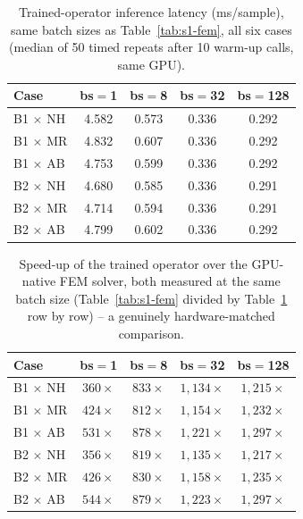 \documentclass[11pt]{article}
\begin{document}
\begin{table}[h]
\centering
\caption{Trained-operator inference latency (ms/sample), same batch
  sizes as Table~\ref{tab:s1-fem}, all six cases (median of 50 timed
  repeats after 10 warm-up calls, same GPU).}
\label{tab:s1-op}
\small
\begin{tabular}{lcccc}
\toprule
Case & bs$=$1 & bs$=$8 & bs$=$32 & bs$=$128 \\
\midrule
B1 $\times$ NH & 4.582 & 0.573 & 0.336 & 0.292 \\
B1 $\times$ MR & 4.832 & 0.607 & 0.336 & 0.292 \\
B1 $\times$ AB & 4.753 & 0.599 & 0.336 & 0.292 \\
B2 $\times$ NH & 4.680 & 0.585 & 0.336 & 0.291 \\
B2 $\times$ MR & 4.714 & 0.594 & 0.336 & 0.291 \\
B2 $\times$ AB & 4.799 & 0.602 & 0.336 & 0.292 \\
\bottomrule
\end{tabular}
\end{table}

\begin{table}[h]
\centering
\caption{Speed-up of the trained operator over the GPU-native FEM
  solver, both measured at the same batch size (Table~\ref{tab:s1-fem}
  divided by Table~\ref{tab:s1-op} row by row) -- a genuinely
  hardware-matched comparison.}
\label{tab:s1-speedup}
\small
\begin{tabular}{lcccc}
\toprule
Case & bs$=$1 & bs$=$8 & bs$=$32 & bs$=$128 \\
\midrule
B1 $\times$ NH & $360\times$ & $833\times$   & $1{,}134\times$ & $1{,}215\times$ \\
B1 $\times$ MR & $424\times$ & $812\times$   & $1{,}154\times$ & $1{,}232\times$ \\
B1 $\times$ AB & $531\times$ & $878\times$   & $1{,}221\times$ & $1{,}297\times$ \\
B2 $\times$ NH & $356\times$ & $819\times$   & $1{,}135\times$ & $1{,}217\times$ \\
B2 $\times$ MR & $426\times$ & $830\times$   & $1{,}158\times$ & $1{,}235\times$ \\
B2 $\times$ AB & $544\times$ & $879\times$   & $1{,}223\times$ & $1{,}297\times$ \\
\bottomrule
\end{tabular}
\end{table}
\end{document}

